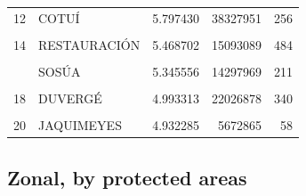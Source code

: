 \documentclass[10pt,landscape,a3paper]{article}
\begin{document}
\begin{table}[H]
\begin{tabular}[t]{llrrr}
12 & COTUÍ & 5.797430 & 38327951 & 256\\
\cellcolor{lightgray}{13} & \cellcolor{lightgray}{LA CIÉNAGA} & \cellcolor{lightgray}{5.664938} & \cellcolor{lightgray}{6620741} & \cellcolor{lightgray}{160}\\
14 & RESTAURACIÓN & 5.468702 & 15093089 & 484\\
\cellcolor{lightgray}{15} & \cellcolor{lightgray}{RÍO SAN JUAN} & \cellcolor{lightgray}{5.459185} & \cellcolor{lightgray}{13348448} & \cellcolor{lightgray}{120}\\
\addlinespace
16 & SOSÚA & 5.345556 & 14297969 & 211\\
\cellcolor{lightgray}{17} & \cellcolor{lightgray}{PEDERNALES} & \cellcolor{lightgray}{5.098481} & \cellcolor{lightgray}{57127986} & \cellcolor{lightgray}{892}\\
18 & DUVERGÉ & 4.993313 & 22026878 & 340\\
\cellcolor{lightgray}{19} & \cellcolor{lightgray}{VILLA LOS ALMÁCIGOS} & \cellcolor{lightgray}{4.946938} & \cellcolor{lightgray}{10260787} & \cellcolor{lightgray}{276}\\
20 & JAQUIMEYES & 4.932285 & 5672865 & 58\\
\bottomrule
\end{tabular}
\end{table}

\hypertarget{zonal-by-protected-areas}{%
\subsection{Zonal, by protected areas}\label{zonal-by-protected-areas}}
\end{document}
